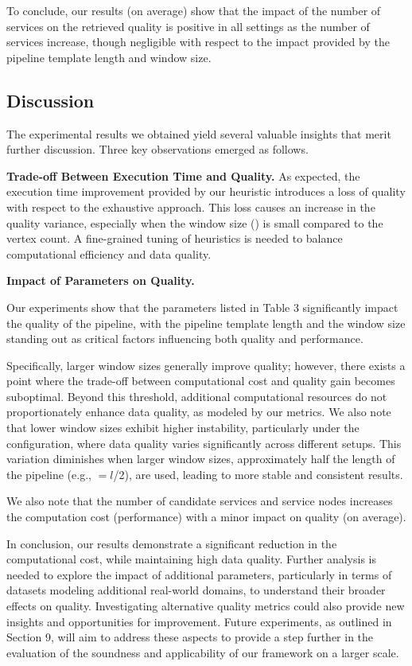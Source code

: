    To conclude, our results (on average) show that the impact of the number of services on the retrieved quality is positive in all settings as the number of services increase, though negligible with respect to the impact provided by the pipeline template length and window size. 

\subsection{Discussion}
The experimental results we obtained yield several valuable insights that merit further discussion. Three key observations emerged as follows.

\vspace{0.5em}

\noindent\textbf{Trade-off Between Execution Time and Quality.} As expected, the execution time improvement provided by our heuristic introduces a loss of quality with respect to the exhaustive approach. This loss causes an increase in the quality variance, especially when the window size (\windowsize) is small compared to the vertex count. A fine-grained tuning of heuristics is needed to balance computational efficiency and data quality.

\vspace{0.5em}

\noindent\textbf{Impact of Parameters on Quality.}
{\color{OurColor2}
  Our experiments show that the parameters listed in Table 3 significantly impact the quality of the pipeline, with the pipeline template length and the window size standing out as critical factors influencing both quality and performance.

  Specifically, larger window sizes generally improve quality; however, there exists a point where the trade-off between computational cost and quality gain becomes suboptimal. Beyond this threshold, additional computational resources do not proportionately enhance data quality, as modeled by our metrics. We also note that lower window sizes exhibit higher instability, particularly under the \wide configuration, where data quality varies significantly across different setups. This variation diminishes when larger window sizes, approximately half the length of the pipeline (e.g., \windowsize$=$$l$/2), are used, leading to more stable and consistent results.

  We also note that the number of candidate services and service nodes increases the computation cost (performance) with a minor impact on quality (on average).

  In conclusion, our results demonstrate a significant reduction in the computational cost, while maintaining high data quality. Further analysis is needed to explore the impact of additional parameters, particularly in terms of datasets modeling additional real-world domains, to understand their broader effects on quality.
  Investigating alternative quality metrics could also provide new insights and opportunities for improvement. Future experiments, as outlined in Section 9, will aim to address these aspects to provide a step further in the evaluation of the soundness and applicability of our framework on a larger scale.
}
\vspace{0.5em}

